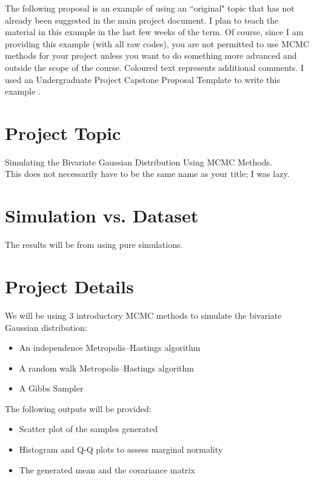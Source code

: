 \documentclass{article}
\begin{document}
    \begin{normalsize}
        The following proposal is an example of using an ``original" topic that has not already been suggested in the main project document. I plan to teach the material in this example in the last few weeks of the term. Of course, since I am providing this example (with all raw codes), you are not permitted to use MCMC methods for your project unless you want to do something more advanced and outside the scope of the course. {\color{WildStrawberry} Coloured text represents additional comments.}
        I used an Undergraduate Project Capstone Proposal Template to write this example \citep{white_capstone_template}.
    
    	\section{Project Topic}
        Simulating the Bivariate Gaussian Distribution Using MCMC Methods. \\
        {\color{WildStrawberry} This does not necessarily have to be the same name as your title; I was lazy.}

        \section{Simulation vs. Dataset}
        The results will be from using pure simulations.
        
        \section{Project Details}
        We will be using 3 introductory MCMC methods to simulate the bivariate Gaussian distribution:
        \begin{itemize}
            \item An independence Metropolis–Hastings algorithm
            \item A random walk Metropolis–Hastings algorithm
            \item A Gibbs Sampler
        \end{itemize}
        The following outputs will be provided:
        \begin{itemize}
            \item Scatter plot of the samples generated
            \item Histogram and Q-Q plots to assess marginal normality
            \item The generated mean and the covariance matrix
        \end{itemize}


\end{normalsize}
\end{document}
